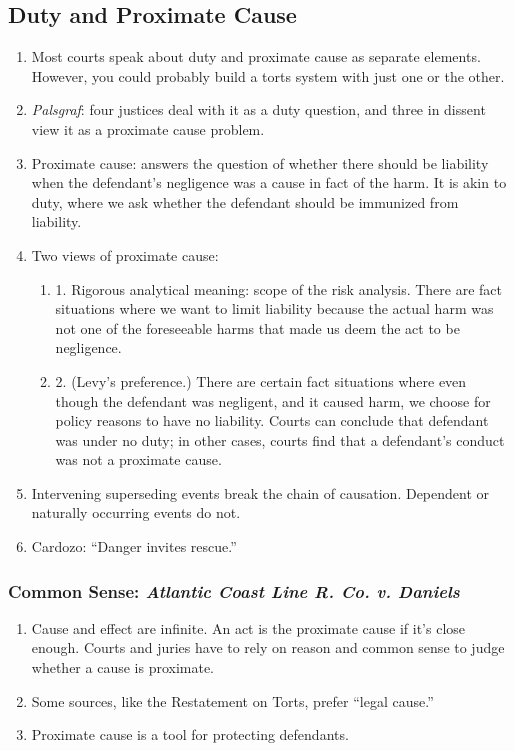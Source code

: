 \subsection{Duty and Proximate Cause}

\begin{enumerate}
    \item Most courts speak about duty and proximate cause as separate 
    elements. However, you could probably build a torts system with just one 
    or the other.
    \item \emph{Palsgraf}: four justices deal with it as a duty question, and 
    three in dissent view it as a proximate cause problem.
    \item Proximate cause: answers the question of whether there should be 
    liability when the defendant's negligence was a cause in fact of the harm. 
    It is akin to duty, where we ask whether the defendant should be immunized 
    from liability.
    \item Two views of proximate cause:
    \begin{enumerate}
        \item 1. Rigorous analytical meaning: scope of the risk analysis. 
        There are fact situations where we want to limit liability because the 
        actual harm was not one of the foreseeable harms that made us deem the 
        act to be negligence.
        \item 2. (Levy's preference.) There are certain fact situations where 
        even though the defendant was negligent, and it caused harm, we choose 
        for policy reasons to have no liability. Courts can conclude that 
        defendant was under no duty; in other cases, courts find that a 
        defendant's conduct was not a proximate cause.
    \end{enumerate}
    \item Intervening superseding events break the chain of causation. 
    Dependent or naturally occurring events do not.
    \item Cardozo: ``Danger invites rescue.''
\end{enumerate}

\subsubsection{Common Sense: \emph{Atlantic Coast Line R. Co. v. Daniels}}

\begin{enumerate}
    \item Cause and effect are infinite. An act is the proximate cause if it's 
    close enough. Courts and juries have to rely on reason and common sense to 
    judge whether a cause is proximate.
    \item Some sources, like the Restatement on Torts, prefer ``legal cause.''
    \item Proximate cause is a tool for protecting defendants.
\end{enumerate}

